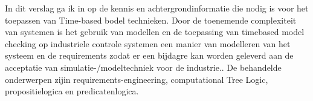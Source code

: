 \documentclass{article}
\begin{document}
	In dit verslag ga ik in op de kennis en achtergrondinformatie die nodig is voor het toepassen van Time-based bodel technieken. 
	 Door de toenemende complexiteit van systemen is het gebruik van modellen en de toepassing van timebased model checking  op industriele controle systemen een manier van modelleren van het systeem en de requirements zodat er een bijdagre kan worden geleverd aan de acceptatie van  simulatie-/modeltechniek voor de industrie.\cite{RijnensupervisorsynthesisLock}. 
	 De behandelde onderwerpen zijin requirements-engineering, computational Tree Logic, propositielogica en predicatenlogica.
%	
%	
%	
%	
%	
%	
%	
%	
%	
\end{document}
